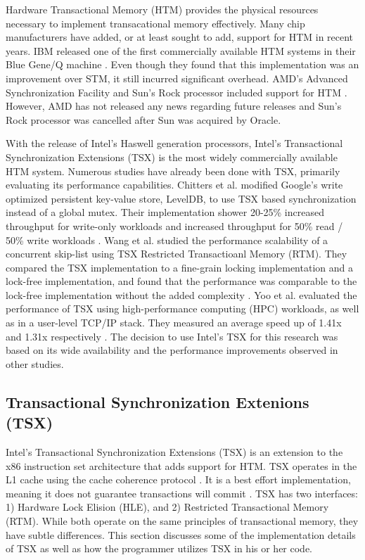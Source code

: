 \documentclass[a4paper]{article}
\begin{document}
\indent Hardware Transactional Memory (HTM) provides the physical resources
necessary to implement transacational memory effectively.  Many chip manufacturers
have added, or at least sought to add, support for HTM in recent years.  IBM
released one of the first commercially available HTM systems in their Blue
Gene/Q machine \cite{blue_wang}.  Even though they found that this
implementation was an improvement over STM, it still incurred significant
overhead.  AMD's Advanced Synchronization Facility and Sun's Rock processor
included support for HTM \cite{chung_amd,rock_dice}.  However, AMD has not
released any news regarding future releases and Sun's Rock processor was
cancelled after Sun was acquired by Oracle.\par

\indent With the release of Intel's Haswell generation processors, Intel's
Transactional Synchronization Extensions (TSX) is the most widely commercially
available HTM system.  Numerous studies have already been done with TSX,
primarily evaluating its performance capabilities.  Chitters et al. modified
Google's write optimized persistent key-value store, LevelDB, to use TSX based
synchronization instead of a global mutex.  Their implementation shower 20-25\%
increased throughput for write-only workloads and increased throughput for 50\%
read / 50\% write workloads \cite{chitters_tsx}.  Wang et al. studied the
performance scalability of a concurrent skip-list using TSX Restricted
Transactioanl Memory (RTM).  They compared the TSX implementation to a
fine-grain locking implementation and a lock-free implementation, and found that
the performance was comparable to the lock-free implementation without the added
complexity \cite{wang_tsx}.  Yoo et al. evaluated the performance of TSX using
high-performance computing (HPC) workloads, as well as in a user-level TCP/IP
stack.  They measured an average speed up of 1.41x and 1.31x respectively
\cite{yoo_tsx}.  The decision to use Intel's TSX for this research was based on
its wide availability and the performance improvements observed in other
studies.\par

\subsection{\textbf{Transactional Synchronization Extenions (TSX)}}

\indent Intel's Transactional Synchronization Extensions (TSX) is an extension
to the x86 instruction set architecture that adds support for HTM.  TSX operates
in the L1 cache using the cache coherence protocol \cite{intel_opt_man}.  It is
a best effort implementation, meaning it does not guarantee transactions will
commit \cite{intel_prog_ref}.  TSX has two interfaces: 1) Hardware Lock Elision
(HLE), and 2) Restricted Transactional Memory (RTM).  While both operate on the
same principles of transactional memory, they have subtle differences.  This
section discusses some of the implementation details of TSX as well as how the
programmer utilizes TSX in his or her code.\par
\end{document}
